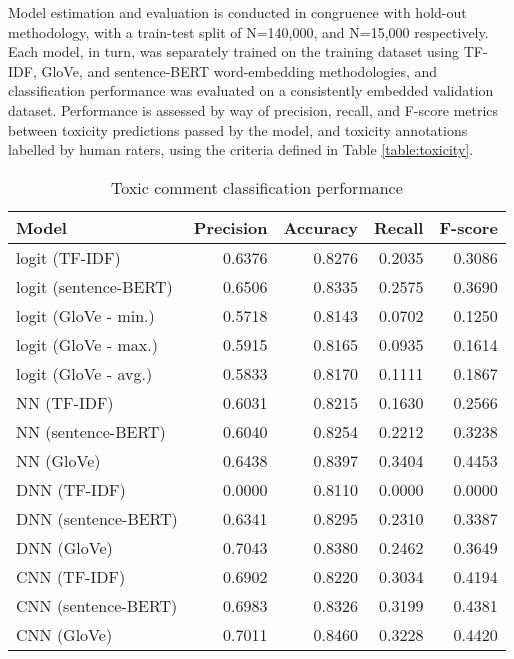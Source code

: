 
Model estimation and evaluation is conducted in congruence with hold-out methodology, with a train-test split of N=140,000, and N=15,000 respectively. Each model, in turn, was separately trained on the training dataset using TF-IDF, GloVe, and sentence-BERT word-embedding methodologies, and classification performance was evaluated on a consistently embedded validation dataset. Performance is assessed by way of precision, recall, and F-score metrics between toxicity predictions passed by the model, and toxicity annotations labelled by human raters, using the criteria defined in Table \ref{table:toxicity}.

\begin{table}[h]
	\caption{Toxic comment classification performance \label{table:estimation-results}}
    \centering
	\begin{tabular}{lrrrr}
		\toprule
			Model &  Precision &  Accuracy &  Recall &  F-score \\
		\midrule
			\addlinespace{}
			\parbox{7.5cm}{logit (TF-IDF)} &     0.6376 &    0.8276 &  0.2035 &   0.3086 \\
			\addlinespace{}
			logit (sentence-BERT) &     0.6506 &    0.8335 &  0.2575 &   0.3690 \\
			\addlinespace{}
			logit (GloVe - min.) &     0.5718 &    0.8143 &  0.0702 &   0.1250 \\
			\addlinespace{}
			logit (GloVe - max.) &     0.5915 &    0.8165 &  0.0935 &   0.1614 \\
			\addlinespace{}
			logit (GloVe - avg.) &     0.5833 &    0.8170 &  0.1111 &   0.1867 \\
			\addlinespace{}
			NN (TF-IDF) &     0.6031 &    0.8215 &  0.1630 &   0.2566 \\
			\addlinespace{}
			NN (sentence-BERT) &     0.6040 &    0.8254 &  0.2212 &   0.3238 \\
			\addlinespace{}
			NN (GloVe) &     0.6438 &    0.8397 &  0.3404 &   0.4453 \\
			\addlinespace{}
			DNN (TF-IDF) &     0.0000 &    0.8110 &  0.0000 &   0.0000 \\
			\addlinespace{}
			DNN (sentence-BERT) &     0.6341 &    0.8295 &  0.2310 &   0.3387 \\
			\addlinespace{}
			DNN (GloVe) &     0.7043 &    0.8380 &  0.2462 &   0.3649 \\
			\addlinespace{}
			CNN (TF-IDF) &     0.6902 &    0.8220 &  0.3034 &   0.4194 \\
			\addlinespace{}
			CNN (sentence-BERT)  &     0.6983 &    0.8326 &  0.3199 &   0.4381 \\
			\addlinespace{}
			CNN (GloVe)  &     0.7011 &    0.8460 &  0.3228 &   0.4420 \\
	\bottomrule
	\end{tabular}
\end{table}